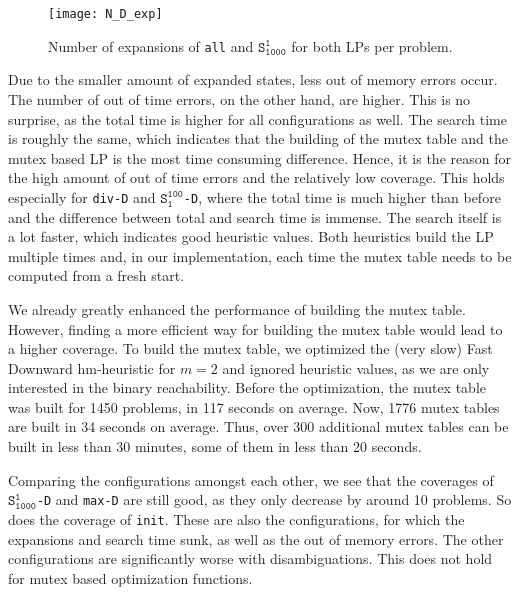 \begin{figure}[h!]
\centering
\texttt{[image: N\_D\_exp]}
\caption{Number of expansions of \texttt{all} and $\texttt{S}_\texttt{1000}^\texttt{1}$ for both LPs per problem.}
\label{fig:N_D_exp}
\end{figure}

Due to the smaller amount of expanded states, less out of memory errors occur.
The number of out of time errors, on the other hand, are higher.
This is no surprise, as the total time is higher for all configurations as well.
The search time is roughly the same, which indicates that the building of the mutex table and the mutex based LP is the most time consuming difference.
Hence, it is the reason for the high amount of out of time errors and the relatively low coverage.
This holds especially for \texttt{div-D} and $\texttt{S}_\texttt{1}^\texttt{100}$\texttt{-D}, where the total time is much higher than before and the difference between total and search time is immense.
The search itself is a lot faster, which indicates good heuristic values.
Both heuristics build the LP multiple times and, in our implementation, each time the mutex table needs to be computed from a fresh start.

We already greatly enhanced the performance of building the mutex table.
However, finding a more efficient way for building the mutex table would lead to a higher coverage.
To build the mutex table, we optimized the (very slow) Fast Downward hm-heuristic for $m=2$ and ignored heuristic values, as we are only interested in the binary reachability.
Before the optimization, the mutex table was built for 1450 problems, in 117 seconds on average.
Now, 1776 mutex tables are built in 34 seconds on average.
Thus, over 300 additional mutex tables can be built in less than 30 minutes, some of them in less than 20 seconds.

Comparing the configurations amongst each other, we see that the coverages of $\texttt{S}_\texttt{1000}^\texttt{1}$\texttt{-D} and \texttt{max-D} are still good, as they only decrease by around 10 problems.
So does the coverage of \texttt{init}.
These are also the configurations, for which the expansions and search time sunk, as well as the out of memory errors.
The other configurations are significantly worse with disambiguations.
This does not hold for mutex based optimization functions.

